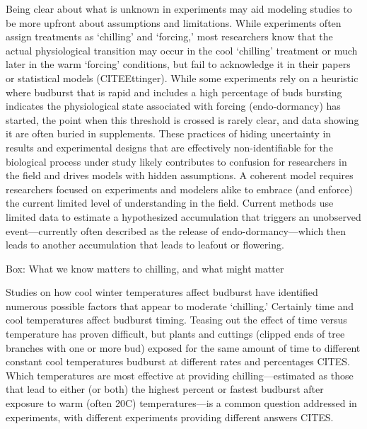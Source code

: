 \documentclass[11pt]{article}
\begin{document}
Being clear about what is unknown in experiments may aid modeling studies to be more upfront about assumptions and limitations. While experiments often assign treatments as `chilling' and `forcing,' most researchers know that the actual physiological transition may occur in the cool `chilling' treatment or much later in the warm `forcing' conditions, but fail to acknowledge it in their papers or statistical models (CITEEttinger). While some experiments rely on a heuristic where budburst that is rapid and includes a high percentage of buds bursting indicates the physiological state associated with forcing (endo-dormancy) has started, the point when this threshold is crossed is rarely clear, and data showing it are often buried in supplements. These practices of hiding uncertainty in results and experimental designs that are effectively non-identifiable for the biological process under study likely contributes to confusion for researchers in the field and drives models with hidden assumptions. A coherent model requires researchers focused on experiments and modelers alike to embrace (and enforce) the current limited level of understanding in the field. Current methods use limited data to estimate a hypothesized accumulation that triggers an unobserved event---currently often described as the release of endo-dormancy---which then leads to another accumulation that leads to leafout or flowering. 

{\sc Box: What we know matters to chilling, and what might matter} %

Studies on how cool winter temperatures affect budburst have identified numerous possible factors that appear to moderate `chilling.' Certainly time and cool temperatures affect budburst timing. Teasing out the effect of time versus temperature has proven difficult, but plants and cuttings (clipped ends of tree branches with one or more bud) exposed for the same amount of time to different constant cool temperatures budburst at different rates and percentages CITES. Which temperatures are most effective at providing chilling---estimated as those that lead to either (or both) the highest percent or fastest budburst after exposure to warm (often 20\degree C) temperatures---is a common question addressed in experiments, with different experiments providing different answers CITES. 
\end{document}
